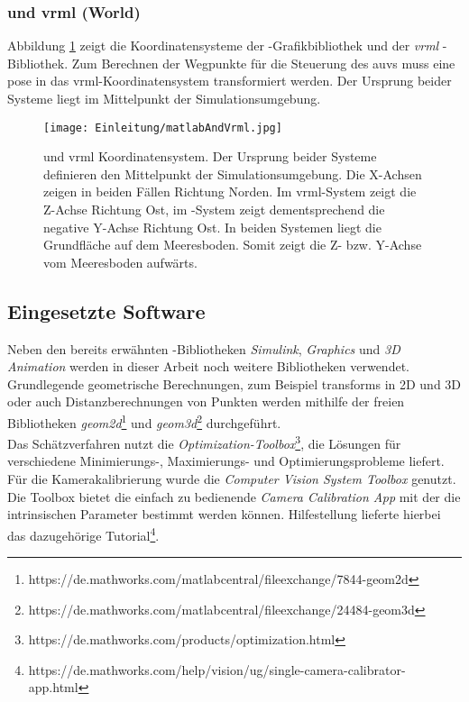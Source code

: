 \subsubsection{\matlab und \gls{vrml} (World)}
Abbildung \ref{Abb. 3} zeigt die Koordinatensysteme der \matlab -Grafikbibliothek und der \textit{\gls{vrml}} -Bibliothek. Zum Berechnen der Wegpunkte für die Steuerung des \gls{auv}s muss eine \gls{pose} in das \gls{vrml}-Koordinatensystem transformiert werden. Der Ursprung beider Systeme liegt im Mittelpunkt der Simulationsumgebung.
\begin{figure}[H]
	\centering
	\texttt{[image: Einleitung/matlabAndVrml.jpg]}
	\caption[\matlab und \gls{vrml} Koordinatensystem]{\matlab und \gls{vrml} Koordinatensystem. Der Ursprung beider Systeme definieren den Mittelpunkt der Simulationsumgebung. Die X-Achsen zeigen in beiden Fällen Richtung Norden. Im \gls{vrml}-System zeigt die Z-Achse Richtung Ost, im \matlab -System zeigt dementsprechend die negative Y-Achse Richtung Ost.  In beiden Systemen liegt die Grundfläche auf dem Meeresboden. Somit zeigt die Z- bzw. Y-Achse vom Meeresboden aufwärts.}
	\label{Abb. 3}
\end{figure}

\subsection{Eingesetzte Software}
Neben den bereits erwähnten \matlab -Bibliotheken \textit{Simulink}, \textit{Graphics} und \textit{3D Animation} werden in dieser Arbeit noch weitere Bibliotheken verwendet.\\
Grundlegende geometrische Berechnungen, zum Beispiel \glspl{transform} in 2D und 3D oder auch Distanzberechnungen von Punkten werden mithilfe der freien Bibliotheken \textit{geom2d}\footnote{https://de.mathworks.com/matlabcentral/fileexchange/7844-geom2d} und \textit{geom3d}\footnote{https://de.mathworks.com/matlabcentral/fileexchange/24484-geom3d} durchgeführt.\\
Das Schätzverfahren nutzt die \textit{Optimization-Toolbox}\footnote{https://de.mathworks.com/products/optimization.html}, die Lösungen für verschiedene Minimierungs-, Maximierungs- und Optimierungsprobleme liefert.\\
Für die Kamerakalibrierung wurde die \textit{Computer Vision System Toolbox} genutzt. Die Toolbox bietet die einfach zu bedienende \textit{Camera Calibration App} mit der die intrinsischen Parameter bestimmt werden können.
Hilfestellung lieferte hierbei das dazugehörige Tutorial\footnote{https://de.mathworks.com/help/vision/ug/single-camera-calibrator-app.html}.\\